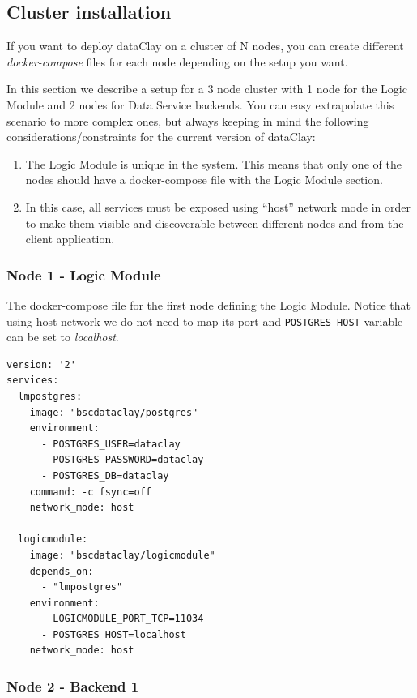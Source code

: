 \subsection{Cluster installation}

If you want to deploy dataClay on a cluster of N nodes, you can create different \textit{docker-compose} files for each node depending on the setup you want.

In this section we describe a setup for a 3 node cluster with 1 node for the Logic Module and 2 nodes for Data Service backends. You can easy extrapolate this scenario to more complex ones, but always keeping in mind the following considerations/constraints for the current version of dataClay:

\begin{enumerate}
 \item The Logic Module is unique in the system. This means that only one of the nodes should have a docker-compose file with the Logic Module section.
 \item In this case, all services must be exposed using ``host'' network mode in order to make them visible and discoverable between different nodes and from the client application.
\end{enumerate}

\subsubsection{Node 1 - Logic Module}

The docker-compose file for the first node defining the Logic Module. Notice that using host network we do not need to map its port and \texttt{POSTGRES\_HOST} variable can be set to \textit{localhost}.

\begin{tBox}
 \begin{lstlisting}[language=docker-compose-2, frame=none]
version: '2'
services:
  lmpostgres:
    image: "bscdataclay/postgres"
    environment:
      - POSTGRES_USER=dataclay
      - POSTGRES_PASSWORD=dataclay
      - POSTGRES_DB=dataclay
    command: -c fsync=off
    network_mode: host

  logicmodule:
    image: "bscdataclay/logicmodule"
    depends_on:
      - "lmpostgres"
    environment:
      - LOGICMODULE_PORT_TCP=11034
      - POSTGRES_HOST=localhost
    network_mode: host
 \end{lstlisting}
\end{tBox}

\subsubsection{Node 2 - Backend 1}

